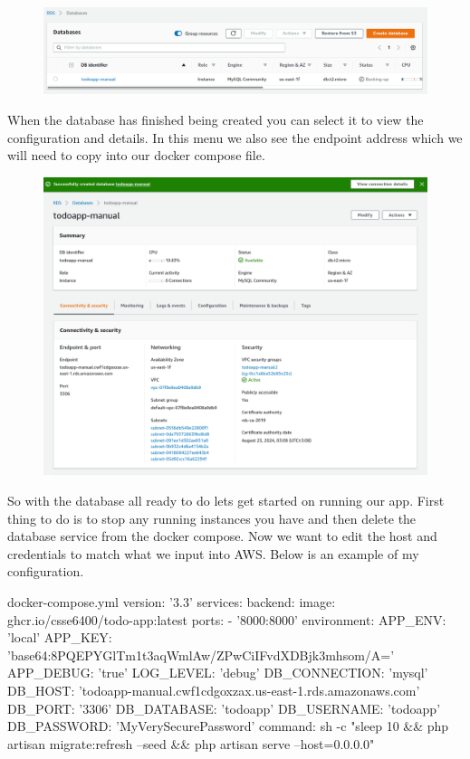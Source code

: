 \documentclass{csse4400}
\begin{document}
\begin{figure}[H]
  \includegraphics[width=\textwidth]{images/aws_4}
\end{figure}

When the database has finished being created you can select it to view the configuration and details. In this menu we also see the 
endpoint address which we will need to copy into our docker compose file.

\begin{figure}[H]
  \includegraphics[width=\textwidth]{images/aws_5}
\end{figure}

So with the database all ready to do lets get started on running our app. First thing to do is to stop any running instances you have 
and then delete the database service from the docker compose. Now we want to edit the host and credentials to match what we input into 
AWS. Below is an example of my configuration.

\begin{code}[language=docker-compose]{docker-compose.yml}
  version: '3.3'
  services:
    backend:
      image: ghcr.io/csse6400/todo-app:latest
      ports:
        - '8000:8000'
      environment:
        APP_ENV: 'local'
        APP_KEY: 'base64:8PQEPYGlTm1t3aqWmlAw/ZPwCiIFvdXDBjk3mhsom/A='
        APP_DEBUG: 'true'
        LOG_LEVEL: 'debug'
        DB_CONNECTION: 'mysql'
        DB_HOST: 'todoapp-manual.cwf1cdgoxzax.us-east-1.rds.amazonaws.com'
        DB_PORT: '3306'
        DB_DATABASE: 'todoapp'
        DB_USERNAME: 'todoapp'
        DB_PASSWORD: 'MyVerySecurePassword'
      command: sh -c "sleep 10 && php artisan migrate:refresh --seed && php artisan serve --host=0.0.0.0"
\end{code}
\end{document}
